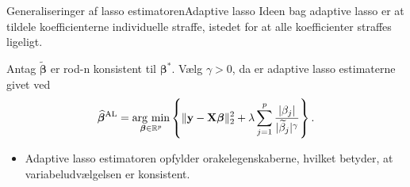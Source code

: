 \begin{frame}{Generaliseringer af lasso estimatoren}{Adaptive lasso}
Ideen bag adaptive lasso er at tildele koefficienterne individuelle straffe, istedet for at alle koefficienter straffes ligeligt.

Antag \(\widetilde{\boldsymbol{\beta}}\) er rod-n konsistent til \(\boldsymbol{\beta}^*\). Vælg \(\gamma >0\), da er adaptive lasso estimaterne givet ved
\begin{align*}
\widehat{\boldsymbol{\beta}}^\text{AL} = \argmin_{\boldsymbol{\beta} \in \R^p} \cbr{ \Vert \mathbf{y} - \mathbf{X} \boldsymbol{\beta} \Vert_2^2 + \lambda \sum_{j=1}^p \frac{ \vert \beta_j \vert}{\vert \widetilde{ \beta}_j \vert^\gamma}}.
\end{align*}
\begin{itemize}
\item Adaptive lasso estimatoren opfylder orakelegenskaberne, hvilket betyder, at variabeludvælgelsen er konsistent.
\end{itemize}
\end{frame}


